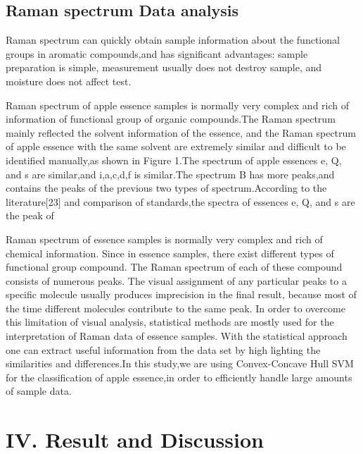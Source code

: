 \documentclass[a4paper]{article}
\begin{document}
\subsection{Raman spectrum Data analysis}
Raman spectrum can quickly obtain sample information about the functional groups in aromatic compounds,and has significant advantages: sample preparation is simple, measurement usually does not destroy sample, and moisture does not affect test.

Raman spectrum of apple essence samples is normally very complex and rich of information of functional group of organic compounds.The Raman spectrum mainly reflected the solvent information of the essence, and the Raman spectrum of apple essence with the same solvent are extremely similar and difficult to be identified manually,as shown in Figure 1.The spectrum of apple essences e, Q, and s are similar,and i,a,c,d,f is similar.The spectrum B has more peaks,and contains the peaks of the previous two types of spectrum.According to the literature[23] and comparison of standards,the spectra of essences e, Q, and s are the peak of

Raman  spectrum  of  essence samples  is  normally  very  complex  and  rich  of  chemical information.  Since  in essence  samples,  there  exist  different  types  of  functional group compound. The Raman spectrum of each of these compound consists of  numerous peaks.  The  visual  assignment  of  any  particular  peaks  to  a  specific  molecule usually  produces  imprecision  in  the  final  result,  because  most  of  the  time  different molecules  contribute  to  the  same  peak.  In  order  to  overcome  this  limitation  of  visual analysis, statistical methods are mostly used for the interpretation of Raman data of essence samples. With the statistical approach one can extract useful information from the data set by high  lighting  the  similarities  and differences.In  this  study,we  are using Convex-Concave Hull SVM  for  the  classification of  apple essence,in order to efficiently handle large amounts of sample data.
\section{IV. Result and Discussion}
\end{document}
